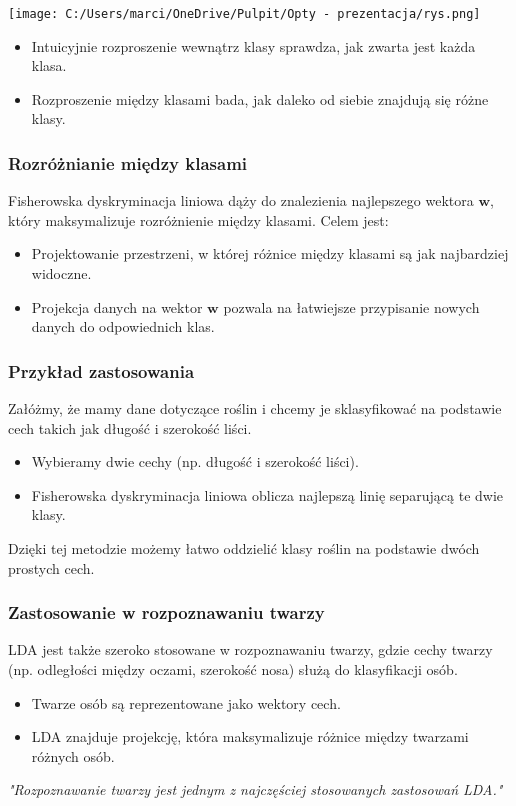 \documentclass{beamer}
\begin{document}
\begin{frame}
    \texttt{[image: C:/Users/marci/OneDrive/Pulpit/Opty - prezentacja/rys.png]}
    
    \bigskip
    \begin{itemize}
        \item Intuicyjnie rozproszenie wewnątrz klasy sprawdza, jak zwarta jest każda klasa.
        \item Rozproszenie między klasami bada, jak daleko od siebie znajdują się różne klasy.
    \end{itemize}
\end{frame}



\begin{frame}
    \frametitle{Rozróżnianie między klasami}
    Fisherowska dyskryminacja liniowa dąży do znalezienia najlepszego wektora \( \mathbf{w} \), który maksymalizuje rozróżnienie między klasami. Celem jest:
    \begin{itemize}
        \item Projektowanie przestrzeni, w której różnice między klasami są jak najbardziej widoczne.
        \item Projekcja danych na wektor \( \mathbf{w} \) pozwala na łatwiejsze przypisanie nowych danych do odpowiednich klas.
    \end{itemize}
\end{frame}



\begin{frame}
    \frametitle{Przykład zastosowania}
    Załóżmy, że mamy dane dotyczące roślin i chcemy je sklasyfikować na podstawie cech takich jak długość i szerokość liści. 
    \begin{itemize}
        \item Wybieramy dwie cechy (np. długość i szerokość liści).
        \item Fisherowska dyskryminacja liniowa oblicza najlepszą linię separującą te dwie klasy.
    \end{itemize}
    
    Dzięki tej metodzie możemy łatwo oddzielić klasy roślin na podstawie dwóch prostych cech.
\end{frame}

\begin{frame}
    \frametitle{Zastosowanie w rozpoznawaniu twarzy}
    LDA jest także szeroko stosowane w rozpoznawaniu twarzy, gdzie cechy twarzy (np. odległości między oczami, szerokość nosa) służą do klasyfikacji osób.
    \begin{itemize}
        \item Twarze osób są reprezentowane jako wektory cech.
        \item LDA znajduje projekcję, która maksymalizuje różnice między twarzami różnych osób.
    \end{itemize}
    \textit{"Rozpoznawanie twarzy jest jednym z najczęściej stosowanych zastosowań LDA."}
\end{frame}
\end{document}

